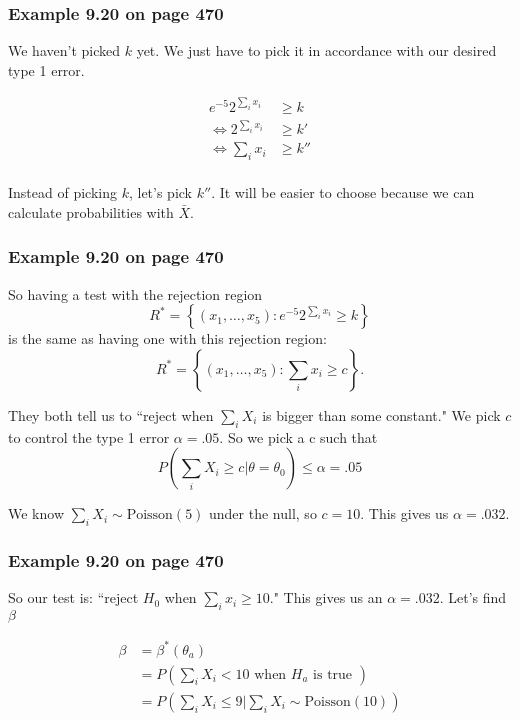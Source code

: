 \documentclass{beamer}
\begin{document}
\begin{frame}
\frametitle{Example 9.20 on page 470}

We haven't picked $k$ yet. We just have to pick it in accordance with our desired type 1 error.

\begin{align*}
e^{-5}2^{\sum_i x_i}  &\ge k \\
\iff 2^{\sum_i x_i} & \ge k' \\
\iff \sum_i x_i & \ge k'' \\
\end{align*}

Instead of picking $k$, let's pick $k''$. It will be easier to choose because we can calculate probabilities with $\bar{X}$.


\end{frame}


\begin{frame}
\frametitle{Example 9.20 on page 470}

So having a test with the rejection region 
\[
R^* = \left\{(x_1, \ldots, x_5) : e^{-5}2^{\sum_i x_i} \ge k \right\}
\]
is the same as having one with this rejection region:
\[
R^* = \left\{(x_1, \ldots, x_5) : \sum_i x_i \ge c \right\}.
\]

They both tell us to ``reject when $\sum_i X_i$ is bigger than some constant." We pick $c$ to control the type 1 error $\alpha = .05$. So we pick a c such that 
\[
P\left(\sum_i X_i \ge c | \theta = \theta_0 \right) \le \alpha = .05
\]

We know $\sum_i X_i \sim \text{Poisson}(5)$ under the null, so $c = 10$. This gives us $\alpha = .032$.


\end{frame}


\begin{frame}
\frametitle{Example 9.20 on page 470}

So our test is: ``reject $H_0$ when $\sum_i x_i \ge 10$." This gives us an $\alpha = .032$. Let's find $\beta$

\begin{align*}
\beta &= \beta^*(\theta_a) \\
&= P\left(\sum_i X_i < 10 \text{ when $H_a$ is true } \right) \\
&= P\left(\sum_i X_i \le 9 \bigg\rvert \sum_i X_i \sim \text{Poisson}(10)\right)
\end{align*}

\end{frame}
\end{document}

